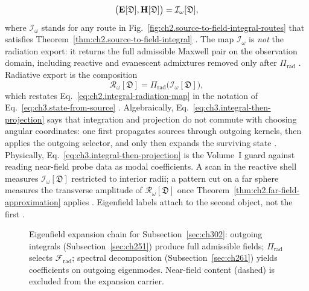 \begin{equation}
\label{eq:ch3.solution-from-integral}
\big(\mathbf{E}[\mathfrak{D}],\mathbf{H}[\mathfrak{D}]\big)
=
\mathcal{I}_\omega[\mathfrak{D}],
\end{equation}
where \(\mathcal{I}_\omega\) stands for any route in
Fig.~\ref{fig:ch2.source-to-field-integral-routes} that satisfies Theorem~\ref{thm:ch2.source-to-field-integral}
\cite{stratton1941}. The map \(\mathcal{I}_\omega\) is \emph{not} the radiation
export: it returns the full admissible Maxwell pair on the observation domain, including reactive
and evanescent admixtures removed only after \(\Pi_{\mathrm{rad}}\) \cite{stratton1941}. Radiative
export is the composition
\begin{equation}
\label{eq:ch3.integral-then-projection}
\mathcal{R}_\omega[\mathfrak{D}]
=
\Pi_{\mathrm{rad}}\big(\mathcal{I}_\omega[\mathfrak{D}]\big),
\end{equation}
which restates Eq.~\eqref{eq:ch2.integral-radiation-map} in the notation of
Eq.~\eqref{eq:ch3.state-from-source} \cite{harrington2001}. Algebraically,
Eq.~\eqref{eq:ch3.integral-then-projection} says that integration and projection do not commute
with choosing angular coordinates: one first propagates sources through outgoing kernels, then
applies the outgoing selector, and only then expands the surviving state
\cite{stratton1941}.
Physically, Eq.~\eqref{eq:ch3.integral-then-projection} is the Volume~I guard against reading
near-field probe data as modal coefficients. A scan in the reactive shell measures
\(\mathcal{I}_\omega[\mathfrak{D}]\) restricted to interior radii; a pattern cut on a far sphere
measures the transverse amplitude of \(\mathcal{R}_\omega[\mathfrak{D}]\) once
Theorem~\ref{thm:ch2.far-field-approximation} applies \cite{stratton1941}. Eigenfield
labels attach to the second object, not the first \cite{harrington2001}.
\begin{figure}[t]
\centering
{}
\caption{Eigenfield expansion chain for Subsection~\ref{sec:ch302}: outgoing integrals
(Subsection~\ref{sec:ch251}) produce full admissible fields; \(\Pi_{\mathrm{rad}}\) selects
\(\mathcal{F}_{\mathrm{rad}}\); spectral decomposition (Subsection~\ref{sec:ch261}) yields
coefficients on outgoing eigenmodes. Near-field content (dashed) is excluded from the expansion
carrier.}
\label{fig:ch3.integral-spectral-eigenfield-chain}
\end{figure}

